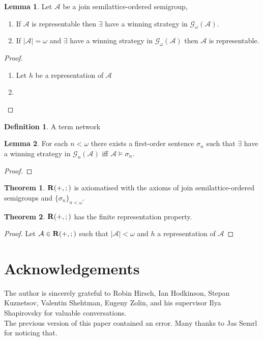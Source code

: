\documentclass[a4paper]{article}
\theoremstyle{definition}
\newtheorem{definition}{Definition}
\theoremstyle{theorem}
\newtheorem{theorem}{Theorem}
\theoremstyle{proposition}
\theoremstyle{lemma}
\newtheorem{lemma}{Lemma}
\theoremstyle{ex}
\theoremstyle{corollary}
\theoremstyle{claim}
\begin{document}
\begin{lemma} Let $\mathcal{A}$ be a join semilattice-ordered semigroup,

  \begin{enumerate}
    \item If $\mathcal{A}$ is representable then $\exists$ have a winning strategy in $\mathcal{G}_{\omega}(\mathcal{A})$.
    \item If $|\mathcal{A}| = \omega$ and $\exists$ have a winning strategy in $\mathcal{G}_{\omega}(\mathcal{A})$ then $\mathcal{A}$ is representable.
  \end{enumerate}
\end{lemma}

\begin{proof}
$ $

  \begin{enumerate}
    \item Let $h$ be a representation of $\mathcal{A}$
    \item
  \end{enumerate}
\end{proof}

\begin{definition}
  A term network
\end{definition}

\begin{lemma}
  For each $n < \omega$ there exists a first-order sentence $\sigma_n$ such that $\exists$ have a winning strategy in $\mathcal{G}_n(\mathcal{A})$ iff $\mathcal{A} \models \sigma_n$.
\end{lemma}

\begin{proof}
\end{proof}

\begin{theorem}
  ${\bf R}(+, ;)$ is axiomatised with the axioms of join semilattice-ordered semigroups and $\{ \sigma_n \}_{n < \omega}$.
\end{theorem}


\begin{theorem}
  ${\bf R}(+, ;)$ has the finite representation property.
\end{theorem}

\begin{proof}
  Let $\mathcal{A} \in {\bf R}(+, ;)$ such that $|\mathcal{A}| < \omega$ and $h$ a representation of $\mathcal{A}$
\end{proof}

\section{Acknowledgements}

The author is sincerely grateful to Robin Hirsch, Ian Hodkinson, Stepan Kuznetsov, Valentin Shehtman, Eugeny Zolin, and his supervisor Ilya Shapirovsky for valuable conversations.\\The previous version of this paper contained an error. Many thanks to Jas Semrl for noticing that.



\end{document}
